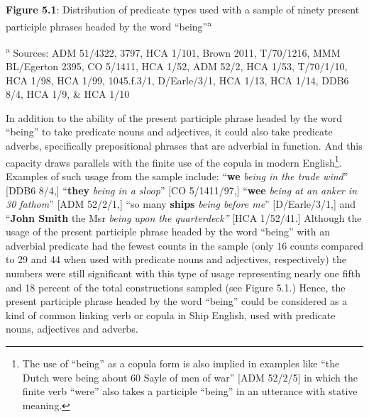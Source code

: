 \begin{styleStandard}

\end{styleStandard}


\begin{styleStandard}
\end{styleStandard}


\begin{styleStandard}
\textbf{Figure 5.1}: Distribution of predicate types used with a sample of ninety present participle phrases headed by the word “being”\textsuperscript{a} 
\end{styleStandard}


\begin{styleStandard}
\textsuperscript{a }Sources: ADM 51/4322, 3797, HCA 1/101, Brown 2011, T/70/1216, MMM BL/Egerton 2395, CO 5/1411, HCA 1/52, ADM 52/2, HCA 1/53, T/70/1/10, HCA 1/98, HCA 1/99, 1045.f.3/1, D/Earle/3/1, HCA 1/13, HCA 1/14, DDB6 8/4, HCA 1/9, \& HCA 1/10
\end{styleStandard}

\begin{styleStandard}
In addition to the ability of the present participle phrase headed by the word “being” to take predicate nouns and adjectives, it could also take predicate adverbs, specifically prepositional phrases that are adverbial in function. And this capacity draws parallels with the finite use of the copula in modern English\footnote{ The use of “being” as a copula form is also implied in examples like “the Dutch were being about 60 Sayle of men of war” [ADM 52/2/5] in which the finite verb “were” also takes a participle “being” in an utterance with stative meaning. }. Examples of such usage from the sample include: “\textbf{we} \textit{being in the trade wind}” [DDB6 8/4,] “\textbf{they} \textit{being in a sloop}” [CO 5/1411/97,] “\textbf{wee }\textit{being at an anker in 30 fathom}” [ADM 52/2/1,] “so many \textbf{ships }\textit{being before me}” [D/Earle/3/1,] and “\textbf{John Smith} the Msr \textit{being upon the quarterdeck” }[HCA 1/52/41.] Although the usage of the present participle phrase headed by the word “being” with an adverbial predicate had the fewest counts in the sample (only 16 counts compared to 29 and 44 when used with predicate nouns and adjectives, respectively) the numbers were still significant with this type of usage representing nearly one fifth and 18 percent of the total constructions sampled (see Figure 5.1.) Hence, the present participle phrase headed by the word “being” could be considered as a kind of common linking verb or copula in Ship English, used with predicate nouns, adjectives and adverbs. 
\end{styleStandard}


